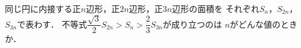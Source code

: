 \documentclass[../../main.tex]{subfiles}
\begin{document}
同じ円に内接する正$n$辺形，正$2n$辺形，正$3n$辺形の面積を
それぞれ$S_n$，$S_{2n}$，$S_{3n}$で表わす．
不等式$\displaystyle\dfrac{\sqrt{3}}{2}S_{2n}>S_n>\dfrac{2}{3}S_{3n}$が成り立つのは
$n$がどんな値のときか．
\end{document}

